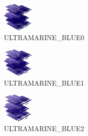 \hspace{0.1cm}
\begin{minipage}[b]{0.15\linewidth}
\begin{figure}[H]                                                          
  \centering                                                             
  \begin{adjustbox}{width=1.5cm,center}                                   
  \includegraphics[width=1.5cm]{src/colorspace_colourflow/flows/colourflow_112-45.png}%
  \end{adjustbox}                                                        
\caption*{ULTRAMARINE\_BLUE0}                                           
\end{figure}                                                               
\end{minipage}
\hspace{0.1cm}
\begin{minipage}[b]{0.15\linewidth}
\begin{figure}[H]                                                          
  \centering                                                             
  \begin{adjustbox}{width=1.5cm,center}                                   
  \includegraphics[width=1.5cm]{src/colorspace_colourflow/flows/colourflow_113-45.png}%
  \end{adjustbox}                                                        
\caption*{ULTRAMARINE\_BLUE1}                                           
\end{figure}                                                               
\end{minipage}
\hspace{0.1cm}
\begin{minipage}[b]{0.15\linewidth}
\begin{figure}[H]                                                          
  \centering                                                             
  \begin{adjustbox}{width=1.5cm,center}                                   
  \includegraphics[width=1.5cm]{src/colorspace_colourflow/flows/colourflow_114-45.png}%
  \end{adjustbox}                                                        
\caption*{ULTRAMARINE\_BLUE2}                                           
\end{figure}                                                               
\end{minipage}

